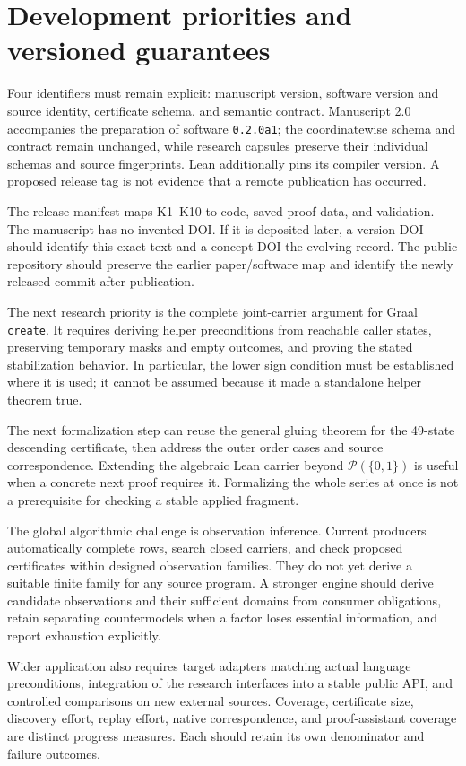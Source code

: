 \section{Development priorities and versioned guarantees}\label{sec:evolution}

Four identifiers must remain explicit: manuscript version, software version and source identity, certificate schema, and semantic contract. Manuscript 2.0 accompanies the preparation of software \texttt{0.2.0a1}; the coordinatewise schema and contract remain unchanged, while research capsules preserve their individual schemas and source fingerprints. Lean additionally pins its compiler version. A proposed release tag is not evidence that a remote publication has occurred.

The release manifest maps K1--K10 to code, saved proof data, and validation. The manuscript has no invented DOI. If it is deposited later, a version DOI should identify this exact text and a concept DOI the evolving record. The public repository should preserve the earlier paper/software map and identify the newly released commit after publication.

The next research priority is the complete joint-carrier argument for Graal \texttt{create}. It requires deriving helper preconditions from reachable caller states, preserving temporary masks and empty outcomes, and proving the stated stabilization behavior. In particular, the lower sign condition must be established where it is used; it cannot be assumed because it made a standalone helper theorem true.

The next formalization step can reuse the general gluing theorem for the 49-state descending certificate, then address the outer order cases and source correspondence. Extending the algebraic Lean carrier beyond $\mathcal P(\{0,1\})$ is useful when a concrete next proof requires it. Formalizing the whole series at once is not a prerequisite for checking a stable applied fragment.

The global algorithmic challenge is observation inference. Current producers automatically complete rows, search closed carriers, and check proposed certificates within designed observation families. They do not yet derive a suitable finite family for any source program. A stronger engine should derive candidate observations and their sufficient domains from consumer obligations, retain separating countermodels when a factor loses essential information, and report exhaustion explicitly.

Wider application also requires target adapters matching actual language preconditions, integration of the research interfaces into a stable public API, and controlled comparisons on new external sources. Coverage, certificate size, discovery effort, replay effort, native correspondence, and proof-assistant coverage are distinct progress measures. Each should retain its own denominator and failure outcomes.
